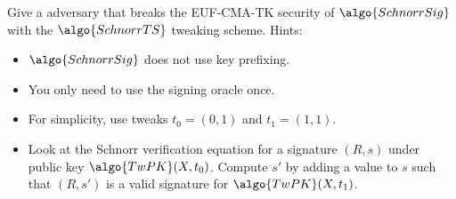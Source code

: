\begin{exercise}\label{ex:schnorrsig-euf-cma-tk-attack}
  Give a \ppt adversary that breaks the EUF-CMA-TK security of $\algo{SchnorrSig}$ with the $\algo{SchnorrTS}$ tweaking scheme. Hints:
  \begin{itemize}
    \item $\algo{SchnorrSig}$ does not use key prefixing.
    \item You only need to use the signing oracle once.
    \item For simplicity, use tweaks $t_0 = (0, 1)$ and $t_1 = (1, 1)$.
    \item Look at the Schnorr verification equation for a signature $(R, s)$ under public key $\algo{TwPK}(X, t_0)$. Compute $s'$ by adding a value to $s$ such that $(R, s')$ is a valid signature for $\algo{TwPK}(X, t_1)$.
  \end{itemize}
\end{exercise}

